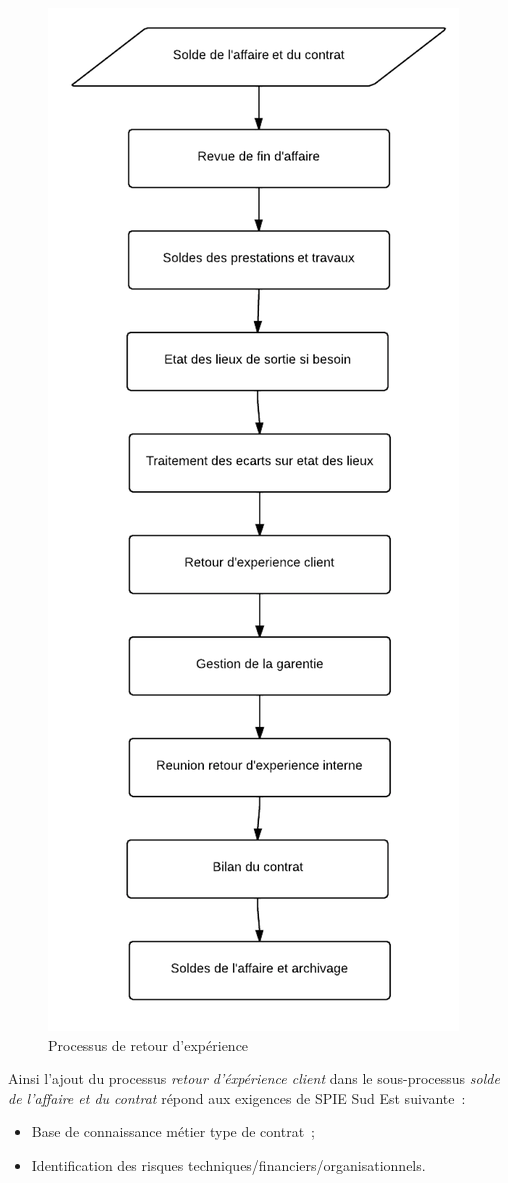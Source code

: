 \begin{figure}[h!]
	\centering
	\includegraphics[width=0.45\linewidth]{images/processus_retour_experience.png}
	\caption{Processus de retour d’expérience}
	\label{fig:processusRetourExperience}
\end{figure}

Ainsi l'ajout du processus \textit{retour d'\'exp\'erience client} dans le sous-processus \textit{solde
de l'affaire et du contrat} r\'epond aux exigences de SPIE Sud Est suivante~:

\begin{itemize}
    \item Base de connaissance m\'etier type de contrat~;
    \item Identification des risques techniques/financiers/organisationnels.
\end{itemize}

